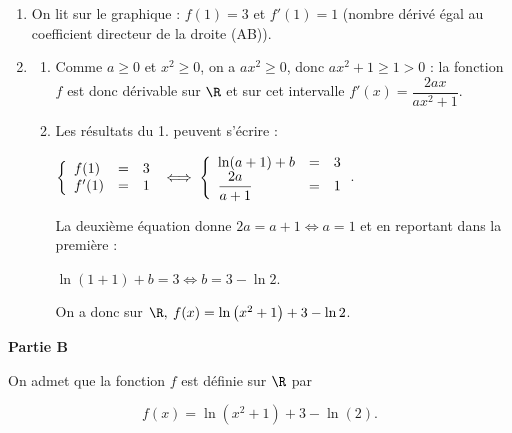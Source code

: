 \begin{enumerate}
\item %
On lit sur le graphique : $f(1) = 3$ et $f'(1) = 1$ (nombre dérivé égal au coefficient directeur de la droite (AB)).
\item %
	\begin{enumerate}
		\item %
		Comme $a \geqslant 0$ et $x^2 \geqslant 0$, on a $ax^2 \geqslant 0$, donc $ax^2 + 1 \geqslant 1 > 0$ : la fonction $f$ est donc dérivable sur $\R$ et sur cet intervalle $f'(x) = \dfrac{2ax}{ax^2 + 1}$.
		\item %
		Les résultats du 1. peuvent s'écrire :
		
$\left\{\begin{array}{l c l}
f(1)&=&3\\
f'(1)&=&1
\end{array}\right. \iff \left\{\begin{array}{l c l}
\ln (a + 1) + b&=&3\\
\dfrac{2a}{a + 1}&=&1
\end{array}\right.$.

La deuxième équation donne $2a = a + 1 \iff a = 1$ et en reportant dans la première :

$\ln (1 + 1) + b = 3 \iff b = 3 - \ln 2$.

On a donc sur $\R, \: f(x) = \ln \left(x^2 + 1 \right) + 3 - \ln 2$.

	\end{enumerate}
\end{enumerate} 

\bigskip

\textbf{Partie B}

\medskip

On admet que la fonction $f$ est définie sur $\R$ par

\[f(x) = \ln \left(x^2 + 1\right) + 3 - \ln (2).\]

\medskip

